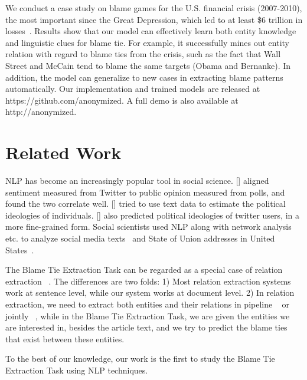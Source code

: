 \documentclass[11pt,a4paper]{article}
\begin{document}
We conduct a case study on blame games for the U.S. financial crisis (2007-2010), the most important since the Great Depression, which led to at least \$6 trillion in losses~\cite{luttrell2013assessing}. Results show that our model can effectively learn both entity knowledge and linguistic clues for blame tie. For example, it successfully mines out entity relation with regard to blame ties from the crisis, such as the fact that Wall Street and McCain tend to blame the same targets (Obama and Bernanke). In addition, the model can generalize to new cases in extracting blame patterns automatically. Our implementation and trained models are released at https://github.com/anonymized. A full demo is also available at http://anonymized.

\section{Related Work}
\label{task}

NLP has become an increasingly popular tool in social science. \citeauthor{o2010tweets} [\citeyear{o2010tweets}] aligned sentiment measured from Twitter to public opinion measured from polls, and found the two correlate well. \citeauthor{bamman2015open} [\citeyear{bamman2015open}] tried to use text data to estimate the political ideologies of individuals. \citeauthor{preoctiuc2017beyond} [\citeyear{preoctiuc2017beyond}] also predicted political ideologies of twitter users, in a more fine-grained form. Social scientists used NLP along with network analysis etc. to analyze social media texts~\cite{rule2015lexical} and State of Union addresses in United States~\cite{bail2016combining}.

The Blame Tie Extraction Task can be regarded as a special case of relation extraction ~\cite{miwa2016end}. The differences are two folds: 1) Most relation extraction systems work at sentence level, while our system works at document level. 2) In relation extraction, we need to extract both entities and their relations in pipeline ~\cite{nadeau2007survey,rink2010utd} or jointly ~\cite{zheng2017joint}, while in the Blame Tie Extraction Task, we are given the entities we are interested in, besides the article text, and we try to predict the blame ties that exist between these entities.

To the best of our knowledge, our work is the first to study the Blame Tie Extraction Task using NLP techniques.
\end{document}

